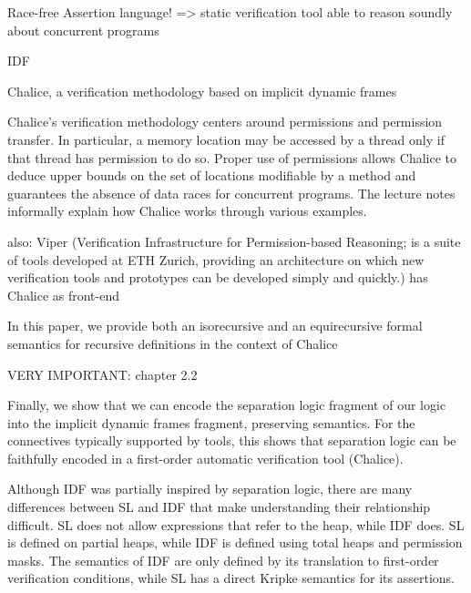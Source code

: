 Race-free Assertion language! => static verification tool able to reason soundly about concurrent programs


\cite{smans2009implicit}
IDF


\cite{leino2009verification}
Chalice, a verification methodology based on implicit dynamic frames

Chalice’s verification methodology centers around permissions and permission transfer. In particular, a memory location may be accessed by a thread only if that thread has permission to do so. Proper use of permissions allows Chalice to deduce upper bounds on the set of locations modifiable by a method and guarantees the absence of data races for concurrent programs. The lecture notes informally explain how Chalice works through various examples.

also: Viper (Verification Infrastructure for Permission-based Reasoning; is a suite of tools developed at ETH Zurich, providing an architecture on which new verification tools and prototypes can be developed simply and quickly.) has Chalice as front-end

\cite{summers2013formal}
In this paper, we provide both an isorecursive and an equirecursive formal
semantics for recursive definitions in the context of Chalice

\cite{parkinson2011relationship}
VERY IMPORTANT: chapter 2.2

Finally, we show that we can encode the separation
logic fragment of our logic into the implicit dynamic frames fragment, preserving
semantics. For the connectives typically supported by tools, this shows that separation
logic can be faithfully encoded in a first-order automatic verification tool (Chalice).

Although IDF was partially inspired by separation logic, there are many differences
between SL and IDF that make understanding their relationship difficult. SL does not
allow expressions that refer to the heap, while IDF does. SL is defined on partial heaps,
while IDF is defined using total heaps and permission masks. The semantics of IDF are only defined by its translation to first-order verification conditions, while SL has a direct
Kripke semantics for its assertions.

